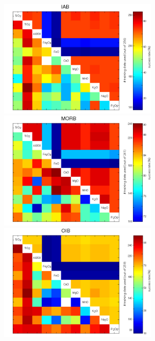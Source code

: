 \begin{figure}[htbp]
  \centering
  \includegraphics[width=300]{figures/xPlotMajor2_quadratic_IAB.jpg}
  \includegraphics[width=300]{figures/xPlotMajor2_quadratic_MORB.jpg}\\
  \includegraphics[width=300]{figures/xPlotMajor2_quadratic_OIB.jpg}

\end{figure}
